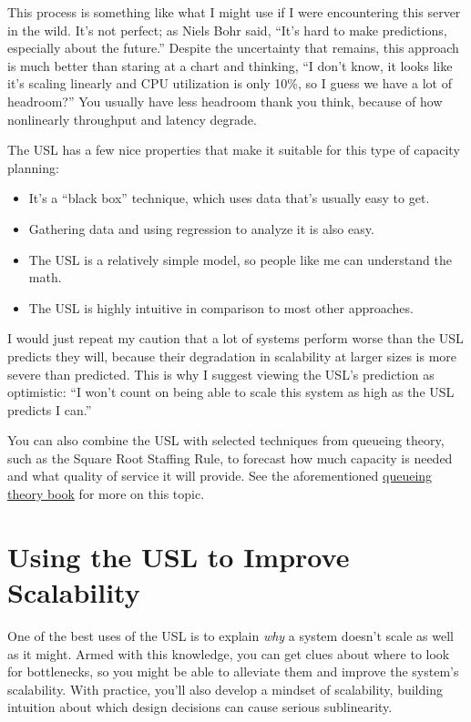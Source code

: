 \documentclass{vivid_layout}
\begin{document}
This process is something like what I might use if I were encountering this
server in the wild. It's not perfect; as Niels Bohr said, ``It's hard to make
predictions, especially about the future.'' Despite the uncertainty that
remains, this approach is much better than staring at a chart and thinking, ``I
don't know, it looks like it's scaling linearly and CPU utilization is only
10\%, so I guess we have a lot of headroom?'' You usually have less headroom
thank you think, because of how nonlinearly throughput and latency degrade.

The USL has a few nice properties that make it suitable for this type of
capacity planning:

\begin{itemize}
\item It's a ``black box'' technique, which uses data that's usually easy to get.
\item Gathering data and using regression to analyze it is also easy.
\item The USL is a relatively simple model, so people like me can understand the math. 
\item The USL is highly intuitive in comparison to most other approaches.
\end{itemize}

I would just repeat my caution that a lot of systems perform worse than the USL
predicts they will, because their degradation in scalability at larger sizes is
more severe than predicted. This is why I suggest viewing the USL's prediction
as optimistic: ``I won't count on being able to scale this system as high as the
USL predicts I can.''

You can also combine the USL with selected techniques from queueing theory, such
as the Square Root Staffing Rule, to forecast how much capacity is needed and
what quality of service it will provide. See the aforementioned
\href{https://www.vividcortex.com/resources/queueing-theory/}{queueing theory
book} for more on this topic.

\section{Using the USL to Improve Scalability}

One of the best uses of the USL is to explain {\itshape why} a system doesn't
scale as well as it might. Armed with this knowledge, you can get clues about
where to look for bottlenecks, so you might be able to alleviate them and
improve the system's scalability.  With practice, you'll also develop a mindset
of scalability, building intuition about which design decisions can cause
serious sublinearity.
\end{document}
